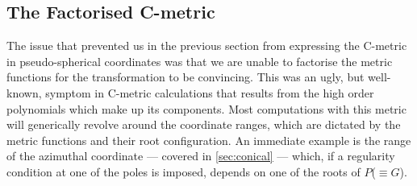 \documentclass[
twoside,
openright,
frontopenright,
]{dmathesis}
\begin{document}
\subsection{The Factorised C-metric}
\label{sec:factorised}

The issue that prevented us in the previous section from expressing the C-metric
in pseudo-spherical coordinates was that we are unable to factorise the metric
functions for the transformation to be convincing. This was an ugly, but
well-known, symptom in C-metric calculations that results from the high order
polynomials which make up its components. Most computations with this metric
will generically revolve around the coordinate ranges, which are dictated by the
metric functions and their root configuration. An immediate example is the range
of the azimuthal coordinate --- covered in \cref{sec:conical} --- which, if a
regularity condition at one of the poles is imposed, depends on one of the roots
of $P$($\equiv G$).
\end{document}
